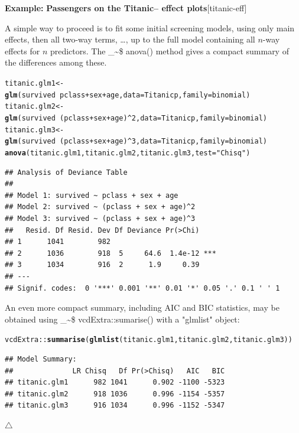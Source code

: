 \documentclass{article}
\makeatletter
\newcommand{\hlnum}[1]{\textcolor[rgb]{0.686,0.059,0.569}{#1}}%
\newcommand{\hlstr}[1]{\textcolor[rgb]{0.192,0.494,0.8}{#1}}%
\newcommand{\hlopt}[1]{\textcolor[rgb]{0,0,0}{#1}}%
\newcommand{\hlstd}[1]{\textcolor[rgb]{0.345,0.345,0.345}{#1}}%
\newcommand{\hlkwb}[1]{\textcolor[rgb]{0.69,0.353,0.396}{#1}}%
\newcommand{\hlkwc}[1]{\textcolor[rgb]{0.333,0.667,0.333}{#1}}%
\newcommand{\hlkwd}[1]{\textcolor[rgb]{0.737,0.353,0.396}{\textbf{#1}}}%
\newenvironment{kframe}{%
 \def\at@end@of@kframe{}%
 \ifinner\ifhmode%
  \def\at@end@of@kframe{\end{minipage}}%
  \begin{minipage}{\columnwidth}%
 \fi\fi%
 \def\FrameCommand##1{\hskip\@totalleftmargin \hskip-\fboxsep
 \colorbox{shadecolor}{##1}\hskip-\fboxsep
     \hskip-\linewidth \hskip-\@totalleftmargin \hskip\columnwidth}%
 \MakeFramed {\advance\hsize-\width
   \@totalleftmargin\z@ \linewidth\hsize
   \@setminipage}}%
 {\par\unskip\endMakeFramed%
 \at@end@of@kframe}
\newenvironment{knitrout}{}{} %
\newcommand{\class}[1]{\textsf{"#1"}}
\newcommand\code{\bgroup\@makeother\_\@makeother\~\@makeother\$\@codex}
\def\@codex#1{{\normalfont\ttfamily\hyphenchar\font=-1 #1}\egroup}
\newcommand{\func}[1]{\code{#1()}}
\newenvironment{Example}[2][unnamed-example]%
  {\medskip\noindent\textbf{\textsf{Example:}}
   \textbf{#2}\hfill [#1]\par\smallskip
  }
  {\hfill $\triangle$}
\makeatother
\begin{document}
\begin{Example}[titanic-eff]{Passengers on the Titanic-- effect plots}
A simple way to proceed is to fit some initial screening models, 
using only main effects, then all two-way terms, \dots, up to the
full model containing all $n$-way effects for $n$ predictors.
The \func{anova} method gives a compact summary of the differences among these.
\begin{knitrout}
\color{fgcolor}\begin{kframe}
\begin{alltt}
\hlstd{titanic.glm1} \hlkwb{<-} \hlkwd{glm}\hlstd{(survived} \hlopt{~} \hlstd{pclass} \hlopt{+} \hlstd{sex} \hlopt{+} \hlstd{age,} \hlkwc{data}\hlstd{=Titanicp,} \hlkwc{family}\hlstd{=binomial)}
\hlstd{titanic.glm2} \hlkwb{<-} \hlkwd{glm}\hlstd{(survived} \hlopt{~} \hlstd{(pclass} \hlopt{+} \hlstd{sex} \hlopt{+} \hlstd{age)}\hlopt{^}\hlnum{2}\hlstd{,} \hlkwc{data}\hlstd{=Titanicp,} \hlkwc{family}\hlstd{=binomial)}
\hlstd{titanic.glm3} \hlkwb{<-} \hlkwd{glm}\hlstd{(survived} \hlopt{~} \hlstd{(pclass} \hlopt{+} \hlstd{sex} \hlopt{+} \hlstd{age)}\hlopt{^}\hlnum{3}\hlstd{,} \hlkwc{data}\hlstd{=Titanicp,} \hlkwc{family}\hlstd{=binomial)}
\hlkwd{anova}\hlstd{(titanic.glm1, titanic.glm2, titanic.glm3,} \hlkwc{test}\hlstd{=}\hlstr{"Chisq"}\hlstd{)}
\end{alltt}
\begin{verbatim}
## Analysis of Deviance Table
## 
## Model 1: survived ~ pclass + sex + age
## Model 2: survived ~ (pclass + sex + age)^2
## Model 3: survived ~ (pclass + sex + age)^3
##   Resid. Df Resid. Dev Df Deviance Pr(>Chi)    
## 1      1041        982                         
## 2      1036        918  5     64.6  1.4e-12 ***
## 3      1034        916  2      1.9     0.39    
## ---
## Signif. codes:  0 '***' 0.001 '**' 0.01 '*' 0.05 '.' 0.1 ' ' 1
\end{verbatim}
\end{kframe}
\end{knitrout}

An even more compact summary, including AIC and BIC statistics, may be obtained
using \func{vcdExtra::sumarise} with a \class{glmlist} object:
\begin{knitrout}
\color{fgcolor}\begin{kframe}
\begin{alltt}
\hlstd{vcdExtra::}\hlkwd{summarise}\hlstd{(}\hlkwd{glmlist}\hlstd{(titanic.glm1, titanic.glm2, titanic.glm3))}
\end{alltt}
\begin{verbatim}
## Model Summary:
##              LR Chisq   Df Pr(>Chisq)   AIC   BIC
## titanic.glm1      982 1041      0.902 -1100 -5323
## titanic.glm2      918 1036      0.996 -1154 -5357
## titanic.glm3      916 1034      0.996 -1152 -5347
\end{verbatim}
\end{kframe}
\end{knitrout}




\end{Example}
\end{document}

